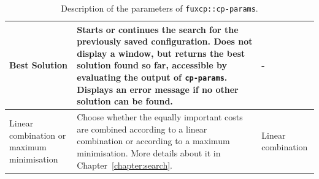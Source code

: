 \begin{table}[h!]
\begin{adjustbox}{center}
\begin{tabular}{|m{}|m{}|m{}<{\centering}|}
        \cellcolor[HTML]{D1D1D1}Best Solution &
          Starts or continues the search for the previously saved configuration. Does not display a window, but returns the best solution found so far, accessible by evaluating the output of \texttt{cp-params}. Displays an error message if no other solution can be found.&
          - \\ \hline
        \hline
        \cellcolor[HTML]{fff078}Linear combination or maximum minimisation &
          Choose whether the equally important costs are combined according to a linear combination or according to a maximum minimisation. More details about it in Chapter~\ref{chapter:search}.&
          Linear combination \\ \hline
        \end{tabular}
    \end{adjustbox}
    \caption{Description of the parameters of \texttt{fuxcp::cp-params}.}
    \label{tab:cp-params}
\end{table}

